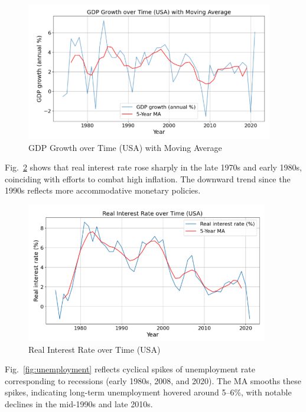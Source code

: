 \documentclass[conference]{IEEEtran}
\begin{document}
\begin{figure}[H]
    \centering
    \includegraphics[width=0.9\linewidth]{gdp_growth_ma.png}
    \caption{GDP Growth over Time (USA) with Moving Average}
    \label{fig:gdp_growth_ma}
\end{figure}

Fig.~\ref{fig:interest_rate} shows that real interest rate rose sharply in the late 1970s and early 1980s, coinciding with efforts to combat high inflation. The downward trend since the 1990s reflects more accommodative monetary policies.

\begin{figure}[H]
    \centering
    \includegraphics[width=0.9\linewidth]{interest_rate.png}
    \caption{Real Interest Rate over Time (USA)}
    \label{fig:interest_rate}
\end{figure}

Fig.~\ref{fig:unemployment} reflects cyclical spikes of unemployment rate corresponding to recessions (early 1980s, 2008, and 2020). The MA smooths these spikes, indicating long-term unemployment hovered around 5--6\%, with notable declines in the mid-1990s and late 2010s.
\end{document}
